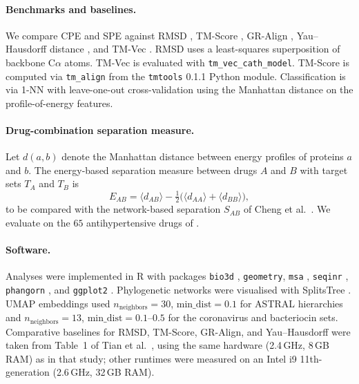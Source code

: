 \documentclass[11pt]{article}
\begin{document}
\paragraph{Benchmarks and baselines.} We compare CPE and SPE against RMSD \cite{kabsch1976rmsd}, TM-Score \cite{zhang2004tmscore}, GR-Align \cite{malod2015graligna}, Yau--Hausdorff distance \cite{tian2020hausdorff}, and TM-Vec \cite{hamamsy2023tmvec}. RMSD uses a least-squares superposition of backbone C$\alpha$ atoms. TM-Vec is evaluated with \texttt{tm\_vec\_cath\_model}. TM-Score is computed via \texttt{tm\_align} from the \texttt{tmtools} 0.1.1 Python module. Classification is via 1-NN with leave-one-out cross-validation using the Manhattan distance on the profile-of-energy features.

\paragraph{Drug-combination separation measure.} Let $d(a,b)$ denote the Manhattan distance between energy profiles of proteins $a$ and $b$. The energy-based separation measure between drugs $A$ and $B$ with target sets $T_A$ and $T_B$ is
\begin{equation}
E_{AB} = \langle d_{AB}\rangle - \tfrac{1}{2}\bigl(\langle d_{AA}\rangle + \langle d_{BB}\rangle\bigr),
\end{equation}
to be compared with the network-based separation $S_{AB}$ of Cheng et al.~\cite{cheng2019network}. We evaluate on the $65$ antihypertensive drugs of \cite{cheng2019network}.

\paragraph{Software.} Analyses were implemented in R with packages \texttt{bio3d} \cite{grant2006bio3d}, \texttt{geometry}, \texttt{msa} \cite{bodenhofer2015msa}, \texttt{seqinr} \cite{charif2007seqinr}, \texttt{phangorn} \cite{schliep2011phangorn}, and \texttt{ggplot2} \cite{wickham2016ggplot2}. Phylogenetic networks were visualised with SplitsTree \cite{bryant2009splitstree}. UMAP embeddings \cite{mcinnes2018umap} used $n_{\mathrm{neighbors}}=30$, $\mathrm{min\_dist}=0.1$ for ASTRAL hierarchies and $n_{\mathrm{neighbors}}=13$, $\mathrm{min\_dist}=0.1$--$0.5$ for the coronavirus and bacteriocin sets. Comparative baselines for RMSD, TM-Score, GR-Align, and Yau--Hausdorff were taken from Table~1 of Tian et al.~\cite{tian2020hausdorff}, using the same hardware (2.4\,GHz, 8\,GB RAM) as in that study; other runtimes were measured on an Intel i9 11th-generation (2.6\,GHz, 32\,GB RAM).
\end{document}
